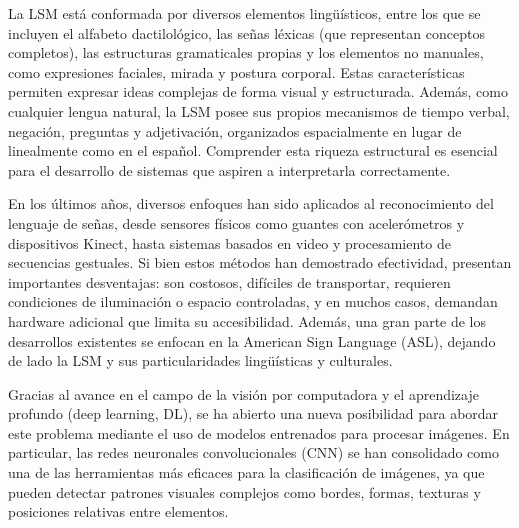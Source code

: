 	La LSM está conformada por diversos elementos lingüísticos, entre los que se incluyen el
	alfabeto dactilológico, las señas léxicas (que representan conceptos completos), las estructuras
	gramaticales propias y los elementos no manuales, como expresiones faciales, mirada y postura
	corporal. Estas características permiten expresar ideas complejas de forma visual y estructurada.
	Además, como cualquier lengua natural, la LSM posee sus propios mecanismos de tiempo verbal,
	negación, preguntas y adjetivación, organizados espacialmente en lugar de linealmente como en
	el español. Comprender esta riqueza estructural es esencial para el desarrollo de sistemas que
	aspiren a interpretarla correctamente.
	
	En los últimos años, diversos enfoques han sido aplicados al reconocimiento del lenguaje de
	señas, desde sensores físicos como guantes con acelerómetros y dispositivos Kinect, hasta
	sistemas basados en video y procesamiento de secuencias gestuales. Si bien estos métodos han
	demostrado efectividad, presentan importantes desventajas: son costosos, difíciles de transportar,
	requieren condiciones de iluminación o espacio controladas, y en muchos casos, demandan
	hardware adicional que limita su accesibilidad. Además, una gran parte de los desarrollos
	existentes se enfocan en la American Sign Language (ASL), dejando de lado la LSM y sus
	particularidades lingüísticas y culturales.
	
	Gracias al avance en el campo de la visión por computadora y el aprendizaje profundo (deep
	learning, DL), se ha abierto una nueva posibilidad para abordar este problema mediante el uso de
	modelos entrenados para procesar imágenes. En particular, las redes neuronales convolucionales
	(CNN) se han consolidado como una de las herramientas más eficaces para la clasificación de
	imágenes, ya que pueden detectar patrones visuales complejos como bordes, formas, texturas y
	posiciones relativas entre elementos.
	

